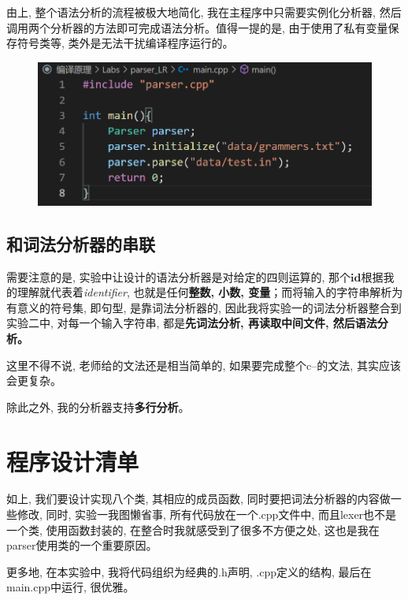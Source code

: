 \documentclass{zpt}
\begin{document}
    由上, 整个语法分析的流程被极大地简化, 我在主程序中只需要实例化分析器, 然后调用两个分析器的方法即可完成语法分析。值得一提的是, 由于使用了私有变量保存符号类等, 类外是无法干扰编译程序运行的。
    \begin{figure}[H]
        \centering
        \includegraphics[width=\textwidth]{../resources/main.png}
    \end{figure}

    \subsection{和词法分析器的串联}
    需要注意的是, 实验中让设计的语法分析器是对给定的四则运算的, 那个$\mathbf{id}$根据我的理解就代表着\emph{identifier}, 也就是任何\textbf{整数, 小数, 变量}；而将输入的字符串解析为有意义的符号集, 即句型, 是靠词法分析器的, 因此我将实验一的词法分析器整合到实验二中, 对每一个输入字符串, 都是\textbf{先词法分析, 再读取中间文件, 然后语法分析。}\par
    这里不得不说, 老师给的文法还是相当简单的, 如果要完成整个c--的文法, 其实应该会更复杂。\par
    除此之外, 我的分析器支持\textbf{多行分析}。


    \section{程序设计清单}
    如上, 我们要设计实现八个类, 其相应的成员函数, 同时要把词法分析器的内容做一些修改, 同时, 实验一我图懒省事, 所有代码放在一个.cpp文件中, 而且lexer也不是一个类, 使用函数封装的, 在整合时我就感受到了很多不方便之处, 这也是我在parser使用类的一个重要原因。\par
    更多地, 在本实验中, 我将代码组织为经典的.h声明, .cpp定义的结构, 最后在main.cpp中运行, 很优雅。\par
\end{document}
